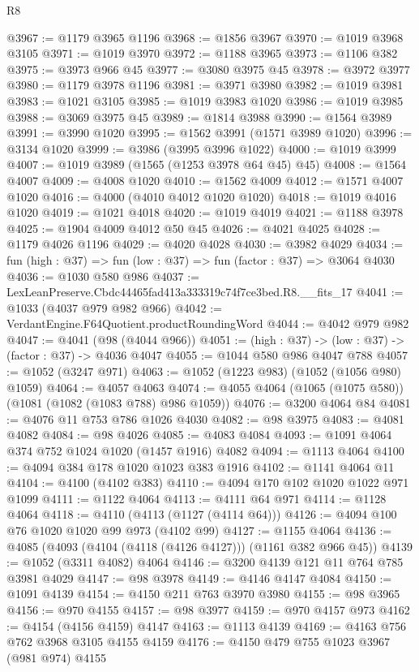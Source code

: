 \begin{lexlean}{R8}
\begin{coremodule}
@3967 := @1179 @3965 @1196
@3968 := @1856 @3967
@3970 := @1019 @3968 @3105
@3971 := @1019 @3970
@3972 := @1188 @3965
@3973 := @1106 @382
@3975 := @3973 @966 @45
@3977 := @3080 @3975 @45
@3978 := @3972 @3977
@3980 := @1179 @3978 @1196
@3981 := @3971 @3980
@3982 := @1019 @3981
@3983 := @1021 @3105
@3985 := @1019 @3983 @1020
@3986 := @1019 @3985
@3988 := @3069 @3975 @45
@3989 := @1814 @3988
@3990 := @1564 @3989
@3991 := @3990 @1020
@3995 := @1562 @3991 (@1571 @3989 @1020)
@3996 := @3134 @1020
@3999 := @3986 (@3995 @3996 @1022)
@4000 := @1019 @3999
@4007 := @1019 @3989 (@1565 (@1253 @3978 @64 @45) @45)
@4008 := @1564 @4007
@4009 := @4008 @1020
@4010 := @1562 @4009
@4012 := @1571 @4007 @1020
@4016 := @4000 (@4010 @4012 @1020 @1020)
@4018 := @1019 @4016 @1020
@4019 := @1021 @4018
@4020 := @1019 @4019
@4021 := @1188 @3978
@4025 := @1904 @4009 @4012 @50 @45
@4026 := @4021 @4025
@4028 := @1179 @4026 @1196
@4029 := @4020 @4028
@4030 := @3982 @4029
@4034 := fun (high : @37) => fun (low : @37) => fun (factor : @37) => @3064 @4030
@4036 := @1030 @580 @986
@4037 := LexLeanPreserve.Cbdc44465fad413a333319c74f7ce3bed.R8.__fits_17
@4041 := @1033 (@4037 @979 @982 @966)
@4042 := VerdantEngine.F64Quotient.productRoundingWord
@4044 := @4042 @979 @982
@4047 := @4041 (@98 (@4044 @966))
@4051 := (high : @37) -> (low : @37) -> (factor : @37) -> @4036 @4047
@4055 := @1044 @580 @986 @4047 @788
@4057 := @1052 (@3247 @971)
@4063 := @1052 (@1223 @983) (@1052 (@1056 @980) @1059)
@4064 := @4057 @4063
@4074 := @4055 @4064 (@1065 (@1075 @580)) (@1081 (@1082 (@1083 @788) @986 @1059))
@4076 := @3200 @4064 @84
@4081 := @4076 @11 @753 @786 @1026 @4030
@4082 := @98 @3975
@4083 := @4081 @4082
@4084 := @98 @4026
@4085 := @4083 @4084
@4093 := @1091 @4064 @374 @752 @1024 @1020 (@1457 @1916) @4082
@4094 := @1113 @4064
@4100 := @4094 @384 @178 @1020 @1023 @383 @1916
@4102 := @1141 @4064 @11
@4104 := @4100 (@4102 @383)
@4110 := @4094 @170 @102 @1020 @1022 @971 @1099
@4111 := @1122 @4064
@4113 := @4111 @64 @971
@4114 := @1128 @4064
@4118 := @4110 (@4113 (@1127 (@4114 @64)))
@4126 := @4094 @100 @76 @1020 @1020 @99 @973 (@4102 @99)
@4127 := @1155 @4064
@4136 := @4085 (@4093 (@4104 (@4118 (@4126 @4127))) (@1161 @382 @966 @45))
@4139 := @1052 (@3311 @4082) @4064
@4146 := @3200 @4139 @121 @11 @764 @785 @3981 @4029
@4147 := @98 @3978
@4149 := @4146 @4147 @4084
@4150 := @1091 @4139
@4154 := @4150 @211 @763 @3970 @3980
@4155 := @98 @3965
@4156 := @970 @4155
@4157 := @98 @3977
@4159 := @970 @4157 @973
@4162 := @4154 (@4156 @4159) @4147
@4163 := @1113 @4139
@4169 := @4163 @756 @762 @3968 @3105 @4155 @4159
@4176 := @4150 @479 @755 @1023 @3967 (@981 @974) @4155

\end{coremodule}
\end{lexlean}
